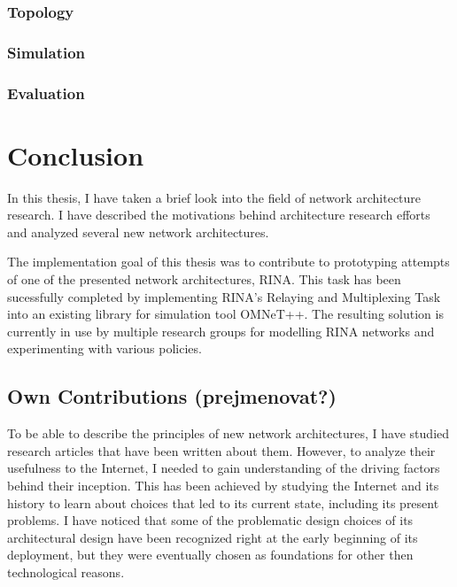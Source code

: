 
        \subsection{Topology}

        \subsection{Simulation}

        \subsection{Evaluation}


\chapter{Conclusion}\label{conclusion}

    In this thesis, I have taken a brief look into the field of network architecture research. I have described the motivations behind architecture research efforts and analyzed several new network architectures.

    The implementation goal of this thesis was to contribute to prototyping attempts of one of the presented network architectures, RINA. This task has been sucessfully completed by implementing RINA's Relaying and Multiplexing Task into an existing library for simulation tool OMNeT++. The resulting solution is currently in use by multiple research groups for modelling RINA networks and experimenting with various policies.

    \section{Own Contributions (prejmenovat?)}

    To be able to describe the principles of new network architectures, I have studied research articles that have been written about them. However, to analyze their usefulness to the Internet, I needed to gain understanding of the driving factors behind their inception. This has been achieved by studying the Internet and its history to learn about choices that led to its current state, including its present problems. I have noticed that some of the problematic design choices of its architectural design have been recognized right at the early beginning of its deployment, but they were eventually chosen as foundations for other then technological reasons.

